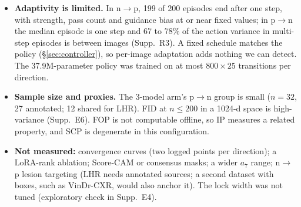 \begin{itemize}
    \item \textbf{Adaptivity is limited.} In n$\to$p, 199 of 200 episodes end after one step, with strength, pass count and guidance bias at or near fixed values; in p$\to$n the median episode is one step and 67 to 78\% of the action variance in multi-step episodes is between images (Supp.~R3). A fixed schedule matches the policy (\S\ref{sec:controller}), so per-image adaptation adds nothing we can detect. The 37.9M-parameter policy was trained on at most $800 \times 25$ transitions per direction.
    \item \textbf{Sample size and proxies.} The 3-model arm's p$\to$n group is small ($n=32$, 27 annotated; 12 shared for LHR). FID at $n \leq 200$ in a 1024-d space is high-variance (Supp.~E6). FOP is not computable offline, so IP measures a related property, and SCP is degenerate in this configuration.
    \item \textbf{Not measured:} convergence curves (two logged points per direction); a LoRA-rank ablation; Score-CAM or consensus masks; a wider $a_7$ range; n$\to$p lesion targeting (LHR needs annotated sources; a second dataset with boxes, such as VinDr-CXR, would also anchor it). The lock width was not tuned (exploratory check in Supp.~E4).
\end{itemize}
